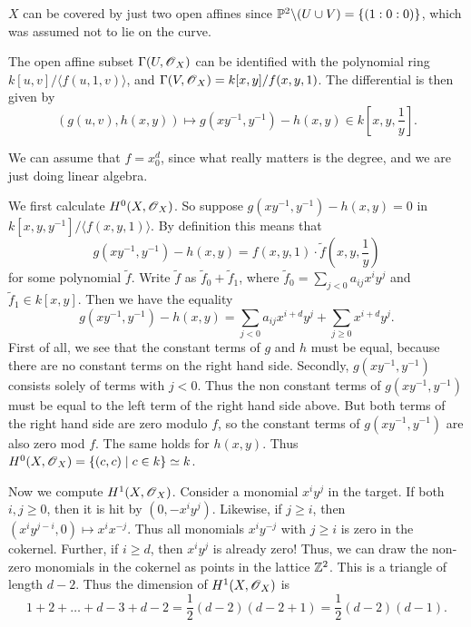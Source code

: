 \documentclass[11pt, english]{article}
\begin{document}
\begin{sol}
 $X$ can be covered by just two open affines since $\mathbb{P}^2 \backslash (U \cup V) = \{(1:0:0)\}$, which was assumed not to lie on the curve.

The open affine subset $\Gamma(U, \operatorname{\mathscr{O}}_X)$ can be identified with the polynomial ring $k[u,v]/\langle f(u,1,v) \rangle$, and $\Gamma(V,\operatorname{\mathscr{O}}_X) = k[x,y]/f(x,y,1)$. The differential is then given by 
\[
\left( g(u,v), h(x,y) \right) \mapsto g(xy^{-1},y^{-1})-h(x,y) \in k[x,y,\frac 1y].
\]

We can assume that $f=x_0^d$, since what really matters is the degree, and we are just doing linear algebra.

We first calculate $H^0(X,\operatorname{\mathscr{O}}_X)$. So suppose $g(xy^{-1}, y^{-1})-h(x,y)=0$ in $k[x,y,y^{-1}]/\langle f(x,y,1) \rangle$. By definition this means that
\[
g(xy^{-1},y^{-1}) - h(x,y) = f(x,y,1) \cdot \tilde f(x,y,\frac 1y)
\]
for some polynomial $\tilde f$. Write $\tilde f$ as $\tilde f_0 + \tilde f_1$, where $\tilde f_0=\sum_{j < 0} a_{ij} x^i y^j$ and $\tilde f_1 \in k[x,y]$. Then we have the equality
\[
g(xy^{-1},y^{-1}) - h(x,y) = \sum_{j < 0} a_{ij}x^{i+d}y^j + \sum_{j \geq 0} x^{i+d} y^j.
\]
First of all, we see that the constant terms of $g$ and $h$ must be equal, because there are no constant terms on the right hand side. Secondly, $g(xy^{-1},y^{-1})$ consists solely of terms with $j < 0$. Thus the non constant terms of  $g(xy^{-1},y^{-1})$ must be equal to the left term of the right hand side above. But both terms of the right hand side are zero modulo $f$, so the constant terms of $g(xy^{-1},y^{-1})$ are also zero mod $f$. The same holds for $h(x,y)$. Thus $H^0(X,\operatorname{\mathscr{O}}_X)= \{ (c,c) \mid c \in k \} \simeq k$.

Now we compute $H^1(X,\operatorname{\mathscr{O}}_X)$. Consider a monomial $x^iy^j$ in the target. If both $i,j \geq 0$, then it is hit by $(0,-x^iy^j)$. Likewise, if $j \geq i$, then $(x^iy^{j-i},0) \mapsto x^i x^{-j}$. Thus all monomials $x^iy^{-j}$ with $j \geq i$ is zero in the cokernel. Further, if $i \geq d$, then $x^i y^j$ is already zero! Thus, we can draw the non-zero monomials in the cokernel as points in the lattice $\mathbb{Z}^2$. This is a triangle of length $d-2$. Thus the dimension of $H^1(X,\operatorname{\mathscr{O}}_X)$ is 
\[
1 + 2 + \ldots+ d-3 + d-2 = \frac 12 (d-2)(d-2+1) = \frac 12 (d-2)(d-1).
\]
\end{sol}
\end{document}
